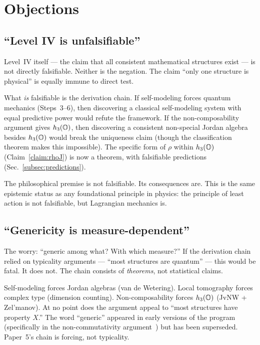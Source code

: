 
\section{Objections}
\label{sec:objections}

\subsection{``Level IV is unfalsifiable''}
\label{subsec:obj-unfalsifiable}

Level~IV itself --- the claim that all consistent mathematical
structures exist --- is not directly falsifiable.  Neither is the
negation.  The claim ``only one structure is physical'' is equally
immune to direct test.

What \emph{is} falsifiable is the derivation chain.  If self-modeling
forces quantum mechanics (Steps~3--6), then discovering a classical
self-modeling system with equal predictive power would refute the
framework.  If the non-composability argument gives $h_3(\mathbb{O})$, then
discovering a consistent non-special Jordan algebra besides $h_3(\mathbb{O})$
would break the uniqueness claim (though the classification theorem
makes this impossible).  The specific form of $\rho$ within $h_3(\mathbb{O})$
(Claim~\ref{claim:rhoJ}) is now a theorem, with falsifiable predictions
(Sec.~\ref{subsec:predictions}).

The philosophical premise is not falsifiable.  Its consequences are.
This is the same epistemic status as any foundational principle in
physics: the principle of least action is not falsifiable, but
Lagrangian mechanics is.

\subsection{``Genericity is measure-dependent''}
\label{subsec:obj-measure}

The worry: ``generic among what?  With which measure?''  If the
derivation chain relied on typicality arguments --- ``most structures
are quantum'' --- this would be fatal.  It does not.  The chain
consists of \emph{theorems}, not statistical claims.

Self-modeling forces Jordan algebras (van de Wetering).  Local
tomography forces complex type (dimension counting).  Non-composability
forces $h_3(\mathbb{O})$ (JvNW + Zel'manov).  At no point does the argument
appeal to ``most structures have property $X$.''  The word ``generic''
appeared in early versions of the program (specifically in the
non-commutativity argument~\citep{motzkintaussky1955}) but has been
superseded.  Paper~5's chain is forcing, not typicality.

